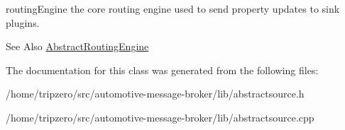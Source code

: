 routing\-Engine the core routing engine used to send property updates to sink plugins. 

\begin{DoxySeeAlso}{See Also}
\hyperlink{classAbstractRoutingEngine}{Abstract\-Routing\-Engine} 
\end{DoxySeeAlso}


The documentation for this class was generated from the following files\-:\begin{DoxyCompactItemize}
\item 
/home/tripzero/src/automotive-\/message-\/broker/lib/abstractsource.\-h\item 
/home/tripzero/src/automotive-\/message-\/broker/lib/abstractsource.\-cpp\end{DoxyCompactItemize}
